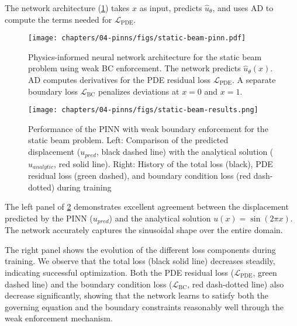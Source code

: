 The network architecture (\cref{fig:pinn_arch_static_beam}) takes $x$ as input, predicts $\hat{u}_\theta$, and uses AD to compute the terms needed for $\mathcal{L}_{\text{PDE}}$.

\begin{figure}[htbp] %
\centering
\texttt{[image: chapters/04-pinns/figs/static-beam-pinn.pdf]} %
\caption{Physics-informed neural network architecture for the static beam problem using weak BC enforcement. The network predicts $\hat{u}_\theta(x)$. AD computes derivatives for the PDE residual loss $\mathcal{L}_{\text{PDE}}$. A separate boundary loss $\mathcal{L}_{\text{BC}}$ penalizes deviations at $x=0$ and $x=1$.}
\label{fig:pinn_arch_static_beam} %
\end{figure}


\begin{figure}
    \centering
    \texttt{[image: chapters/04-pinns/figs/static-beam-results.png]}
    \caption{Performance of the PINN with weak boundary enforcement for the static beam problem. Left: Comparison of the predicted displacement ($u_{pred}$, black dashed line) with the analytical solution ($u_{analytic}$, red solid line). Right: History of the total loss (black), PDE residual loss (green dashed), and boundary condition loss (red dash-dotted) during training}
    \label{fig:static-beam-results}
\end{figure}


The left panel of \cref{fig:static-beam-results} demonstrates excellent agreement between the displacement predicted by the PINN ($u_{pred}$) and the analytical solution $u(x) = \sin(2\pi x)$. The network accurately captures the sinusoidal shape over the entire domain.

The right panel shows the evolution of the different loss components during training. We observe that the total loss (black solid line) decreases steadily, indicating successful optimization. Both the PDE residual loss ($\mathcal{L}_{\text{PDE}}$, green dashed line) and the boundary condition loss ($\mathcal{L}_{\text{BC}}$, red dash-dotted line) also decrease significantly, showing that the network learns to satisfy both the governing equation and the boundary constraints reasonably well through the weak enforcement mechanism.

